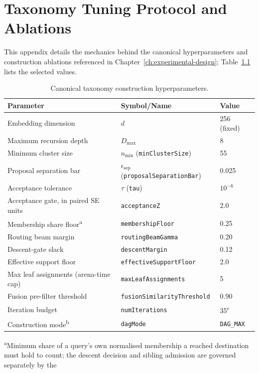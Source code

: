 \chapter{Taxonomy Tuning Protocol and Ablations}\label{app:tuning-protocol}

This appendix details the mechanics behind the canonical hyperparameters
and construction ablations referenced in
Chapter~\ref{ch:experimental-design}; Table~\ref{tab:hyperparams}
lists the selected values.

\begin{table}[h]
\centering
\caption{Canonical taxonomy construction hyperparameters.}
\label{tab:hyperparams}
\begin{tabular}{lll}
\toprule
Parameter & Symbol/Name & Value \\
\midrule
Embedding dimension & $d$ & 256 (fixed) \\
Maximum recursion depth & $D_{\max}$ & 8 \\
Minimum cluster size & $n_{\min}$ (\texttt{minClusterSize}) & 55 \\
Proposal separation bar & $\epsilon_{\text{sep}}$ (\texttt{proposalSeparationBar}) & 0.025 \\
Acceptance tolerance & $\tau$ (\texttt{tau}) & $10^{-6}$ \\
Acceptance gate, in paired SE units & \texttt{acceptanceZ} & 2.0 \\
Membership share floor\textsuperscript{a} & \texttt{membershipFloor} & 0.25 \\
Routing beam margin & \texttt{routingBeamGamma} & 0.20 \\
Descent-gate slack & \texttt{descentMargin} & 0.12 \\
Effective support floor & \texttt{effectiveSupportFloor} & 2.0 \\
Max leaf assignments (arena-time cap) & \texttt{maxLeafAssignments} & 5 \\
Fusion pre-filter threshold & \texttt{fusionSimilarityThreshold} & 0.90 \\
Iteration budget & \texttt{numIterations} & 35\textsuperscript{c} \\
Construction mode\textsuperscript{b} & \texttt{dagMode} & \texttt{DAG\_MAX} \\
\bottomrule
\end{tabular}
\par\smallskip
\footnotesize \textsuperscript{a}Minimum share of a query's own
normalised membership a reached destination must hold to count; the
descent decision and sibling admission are governed separately by the

\end{table}
